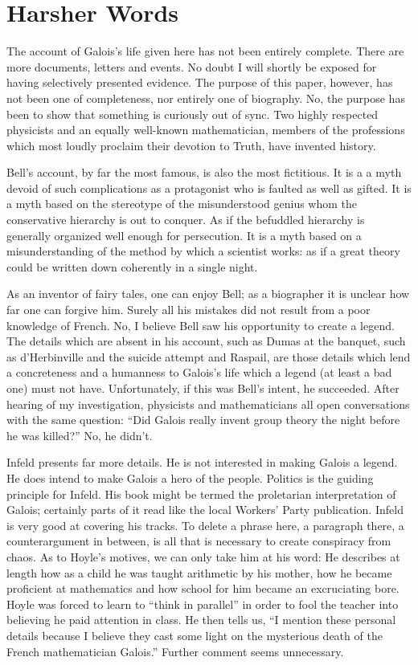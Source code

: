 \documentclass[12pt]{article}
\begin{document}
\section{Harsher Words}

The account of Galois's life given here has not been entirely complete. There are more documents, letters and events. No doubt I will shortly be exposed for having selectively presented evidence. The purpose of this paper, however, has not been one of completeness, nor entirely one of biography. No, the purpose has been to show that something is curiously out of sync. Two highly respected physicists and an equally well-known mathematician, members of the professions which most loudly proclaim their devotion to Truth, have invented history.

Bell's account, by far the most famous, is also the most fictitious. It is a a myth devoid of such complications as a protagonist who is faulted as well as gifted. It is a myth based on the stereotype of the misunderstood genius whom the conservative hierarchy is out to conquer. As if the befuddled hierarchy is generally organized well enough for persecution. It is a myth based on a misunderstanding of the method by which a scientist works: as if a great theory could be written down coherently in a single night.

As an inventor of fairy tales, one can enjoy Bell; as a biographer it is unclear how far one can forgive him. Surely all his mistakes did not result from a poor knowledge of French. No, I believe Bell saw his opportunity to create a legend. The details which are absent in his account, such as Dumas at the banquet, such as d'Herbinville and the suicide attempt and Raspail, are those details which lend a concreteness and a humanness to Galois's life which a legend (at least a bad one) must not have. Unfortunately, if this was Bell's intent, he succeeded. After hearing of my investigation, physicists and mathematicians all open conversations with the same question: ``Did Galois really invent group theory the night before he was killed?'' No, he didn't.

Infeld presents far more details. He is not interested in making Galois a legend. He does intend to make Galois a hero of the people. Politics is the guiding principle for Infeld. His book might be termed the proletarian interpretation of Galois; certainly parts of it read like the local Workers' Party publication. Infeld is very good at covering his tracks. To delete a phrase here, a paragraph there, a counterargument in between, is all that is necessary to create conspiracy from chaos. As to Hoyle's motives, we can only take him at his word: He describes at length how as a child he was taught arithmetic by his mother, how he became proficient at mathematics and how school for him became an excruciating bore. Hoyle was forced to learn to ``think in parallel'' in order to fool the teacher into believing he paid attention in class. He then tells us, ``I mention these personal details because I believe they cast some light on the mysterious death of the French mathematician Galois.'' Further comment seems unnecessary.
\end{document}

